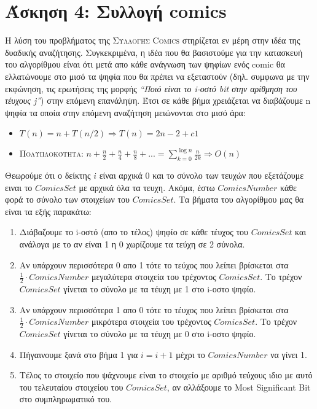 \documentclass[a4paper,12pt]{report}
\begin{document}
\section*{Άσκηση 4: Συλλογή comics}
Η λύση του προβλήματος της \textsc{Συλλογής Comics} στηρίζεται εν μέρη στην ιδέα της δυαδικής αναζήτησης. Συγκεκριμένα, η ιδέα που θα βασιστούμε για την κατασκευή του αλγορίθμου είναι ότι μετά απο κάθε ανάγνωση των ψηφίων ενός comic θα ελλατώνουμε στο μισό τα ψηφία που θα πρέπει να εξεταστούν (δηλ. συμφωνα με την εκφώνηση, τις ερωτήσεις της μορφής \textit{``Ποιό είναι το i-οστό bit στην αρίθμηση του τέυχους j''}) στην επόμενη επανάληψη. Έτσι σε κάθε βήμα χρειάζεται να διαβάζουμε n ψηφία τα οποία στην επόμενη αναζήτηση μειώνονται στο μισό άρα:

\begin{itemize}
 \item $T(n)=n+T(n/2)\Longrightarrow T(n)=2n-2+c1$
 \item \textsc{Πολυπλοκότητα}: $n+\frac{n}{2}+\frac{n}{4}+\frac{n}{8}+...=\sum_{k=0}^{\log n}\frac{n}{2k} \Longrightarrow O(n)$
\end{itemize}

Θεωρούμε ότι ο δείκτης $i$ είναι αρχικά 0 και το σύνολο των τευχών που εξετάζουμε ειναι το $ComicsSet$ με αρχικά όλα τα τευχη. Ακόμα, έστω $ComicsNumber$ κάθε φορά το σύνολο των στοιχείων του $ComicsSet$. Τα βήματα του αλγορίθμου μας θα είναι τα εξής παρακάτω:
\begin{enumerate}
 \item Διάβαζουμε το i-οστό (απο το τέλος) ψηφίο σε κάθε τέυχος του $ComicsSet$ και ανάλογα με το αν είναι 1 η 0 χωρίζουμε τα τεύχη σε 2 σύνολα.
 \item Αν υπάρχουν περισσότερα 0 απο 1 τότε το τεύχος που λείπει βρίσκεται στα $\frac{1}{2} \cdot ComicsNumber$ μεγαλύτερα στοιχεία του τρέχοντος $ComicsSet$. Το τρέχον $ComicsSet$ γίνεται το σύνολο με τα τέυχη με 1 στο i-οστο ψηφίο. 
 \item Αν υπάρχουν περισσότερα 1 απο 0 τότε το τέυχος που λείπει βρίσκεται στα $\frac{1}{2} \cdot ComicsNumber$ μικρότερα στοιχεία του τρέχοντος $ComicsSet$. Το τρέχον $ComicsSet$ γίνεται το σύνολο με τα τέυχη με 0 στο i-οστο ψηφίο.
 \item Πήγαινουμε ξανά στο βήμα 1 για $i = i+1$ μέχρι το $ComicsNumber$ να γίνει 1.
 \item Τέλος το στοιχείο που ψάχνουμε είναι το στοιχείο με αριθμό τεύχους ιδιο με αυτό του τελευταίου στοιχείου του $ComicsSet$, αν αλλάξουμε το Most Significant Bit στο συμπληρωματικό του.
\end{enumerate}
\end{document}
